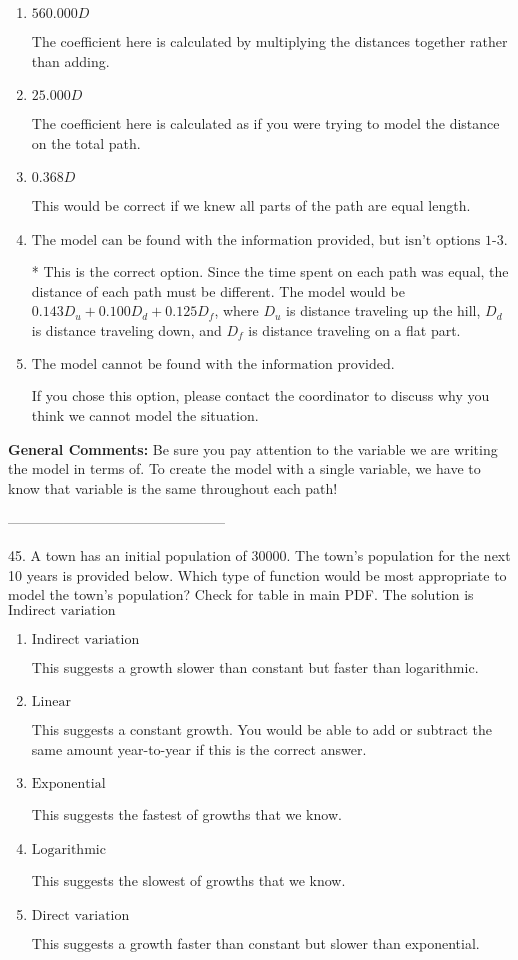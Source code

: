 \documentclass{article}[14pt]
\begin{document}
\begin{enumerate}[label=\Alph*.] 
\item $ 560.000 D $ 

 The coefficient here is calculated by multiplying the distances together rather than adding. 
\item $ 25.000 D $ 

 The coefficient here is calculated as if you were trying to model the distance on the total path. 
\item $ 0.368 D $ 

 This would be correct if we knew all parts of the path are equal length. 
\item $ \text{The model can be found with the information provided, but isn't options 1-3.} $ 

 * This is the correct option. Since the time spent on each path was equal, the distance of each path must be different. The model would be $0.143D_u + 0.100D_d + 0.125D_f$, where $D_u$ is distance traveling up the hill, $D_d$ is distance traveling down, and $D_f$ is distance traveling on a flat part. 
\item $ \text{The model cannot be found with the information provided.} $ 

 If you chose this option, please contact the coordinator to discuss why you think we cannot model the situation. 
\end{enumerate} 
 
\textbf{General Comments:} Be sure you pay attention to the variable we are writing the model in terms of. To create the model with a single variable, we have to know that variable is the same throughout each path!

-----------------------------------------------

45. A town has an initial population of 30000. The town's population for the next 10 years is provided below. Which type of function would be most appropriate to model the town's population?
Check for table in main PDF. 
The solution is $ \text{Indirect variation} $ 

\begin{enumerate}[label=\Alph*.] 
\item $ \text{Indirect variation} $ 

 This suggests a growth slower than constant but faster than logarithmic. 
\item $ \text{Linear} $ 

 This suggests a constant growth. You would be able to add or subtract the same amount year-to-year if this is the correct answer. 
\item $ \text{Exponential} $ 

 This suggests the fastest of growths that we know. 
\item $ \text{Logarithmic} $ 

 This suggests the slowest of growths that we know. 
\item $ \text{Direct variation} $ 

 This suggests a growth faster than constant but slower than exponential. 
\end{enumerate} 
 
\end{document}
